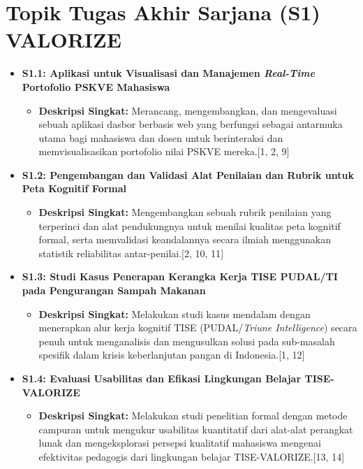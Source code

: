 \documentclass[
  letterpaper,
  DIV=11,
  numbers=noendperiod]{scrreprt}
\providecommand{\tightlist}{%
  \setlength{\itemsep}{0pt}\setlength{\parskip}{0pt}}
\begin{document}
\section{Topik Tugas Akhir Sarjana (S1)
VALORIZE}\label{topik-tugas-akhir-sarjana-s1-valorize}

\begin{itemize}
\tightlist
\item
  \textbf{S1.1: Aplikasi untuk Visualisasi dan Manajemen
  \emph{Real-Time} Portofolio PSKVE Mahasiswa}

  \begin{itemize}
  \tightlist
  \item
    \textbf{Deskripsi Singkat:} Merancang, mengembangkan, dan
    mengevaluasi sebuah aplikasi dasbor berbasis web yang berfungsi
    sebagai antarmuka utama bagi mahasiswa dan dosen untuk berinteraksi
    dan memvisualisasikan portofolio nilai PSKVE mereka.{[}1, 2, 9{]}
  \end{itemize}
\item
  \textbf{S1.2: Pengembangan dan Validasi Alat Penilaian dan Rubrik
  untuk Peta Kognitif Formal}

  \begin{itemize}
  \tightlist
  \item
    \textbf{Deskripsi Singkat:} Mengembangkan sebuah rubrik penilaian
    yang terperinci dan alat pendukungnya untuk menilai kualitas peta
    kognitif formal, serta memvalidasi keandalannya secara ilmiah
    menggunakan statistik reliabilitas antar-penilai.{[}2, 10, 11{]}
  \end{itemize}
\item
  \textbf{S1.3: Studi Kasus Penerapan Kerangka Kerja TISE PUDAL/TI pada
  Pengurangan Sampah Makanan}

  \begin{itemize}
  \tightlist
  \item
    \textbf{Deskripsi Singkat:} Melakukan studi kasus mendalam dengan
    menerapkan alur kerja kognitif TISE (PUDAL/\emph{Triune
    Intelligence}) secara penuh untuk menganalisis dan mengusulkan
    solusi pada sub-masalah spesifik dalam krisis keberlanjutan pangan
    di Indonesia.{[}1, 12{]}
  \end{itemize}
\item
  \textbf{S1.4: Evaluasi Usabilitas dan Efikasi Lingkungan Belajar
  TISE-VALORIZE}

  \begin{itemize}
  \tightlist
  \item
    \textbf{Deskripsi Singkat:} Melakukan studi penelitian formal dengan
    metode campuran untuk mengukur usabilitas kuantitatif dari alat-alat
    perangkat lunak dan mengeksplorasi persepsi kualitatif mahasiswa
    mengenai efektivitas pedagogis dari lingkungan belajar
    TISE-VALORIZE.{[}13, 14{]}
  \end{itemize}
\end{itemize}
\end{document}
